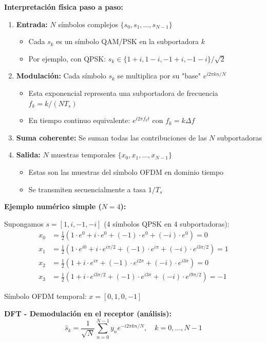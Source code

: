 \documentclass[10pt,a4paper]{article}
\begin{document}
\textbf{Interpretación física paso a paso:}
\begin{enumerate}
\item \textbf{Entrada:} $N$ símbolos complejos $\{s_0, s_1, \ldots, s_{N-1}\}$
  \begin{itemize}
  \item Cada $s_k$ es un símbolo QAM/PSK en la subportadora $k$
  \item Por ejemplo, con QPSK: $s_k \in \{1+i, 1-i, -1+i, -1-i\}/\sqrt{2}$
  \end{itemize}
\item \textbf{Modulación:} Cada símbolo $s_k$ se multiplica por su "base" $e^{i2\pi kn/N}$
  \begin{itemize}
  \item Esta exponencial representa una subportadora de frecuencia $f_k = k/(NT_s)$
  \item En tiempo continuo equivalente: $e^{i2\pi f_k t}$ con $f_k = k\Delta f$
  \end{itemize}
\item \textbf{Suma coherente:} Se suman todas las contribuciones de las $N$ subportadoras
\item \textbf{Salida:} $N$ muestras temporales $\{x_0, x_1, \ldots, x_{N-1}\}$
  \begin{itemize}
  \item Estas son las muestras del símbolo OFDM en dominio tiempo
  \item Se transmiten secuencialmente a tasa $1/T_s$
  \end{itemize}
\end{enumerate}

\textbf{Ejemplo numérico simple ($N=4$):}

Supongamos $s = [1, i, -1, -i]$ (4 símbolos QPSK en 4 subportadoras):
\begin{align*}
x_0 &= \frac{1}{2}(1 \cdot e^0 + i \cdot e^0 + (-1) \cdot e^0 + (-i) \cdot e^0) = 0\\
x_1 &= \frac{1}{2}(1 \cdot e^{i0} + i \cdot e^{i\pi/2} + (-1) \cdot e^{i\pi} + (-i) \cdot e^{i3\pi/2}) = 1\\
x_2 &= \frac{1}{2}(1 + i \cdot e^{i\pi} + (-1) \cdot e^{i2\pi} + (-i) \cdot e^{i3\pi}) = 0\\
x_3 &= \frac{1}{2}(1 + i \cdot e^{i3\pi/2} + (-1) \cdot e^{i3\pi} + (-i) \cdot e^{i9\pi/2}) = -1
\end{align*}

Símbolo OFDM temporal: $x = [0, 1, 0, -1]$

\textbf{DFT - Demodulación en el receptor (análisis):}
$$\boxed{\hat{s}_k = \frac{1}{\sqrt{N}}\sum_{n=0}^{N-1} y_n e^{-i2\pi kn/N}}, \quad k = 0,\ldots,N-1$$
\end{document}

